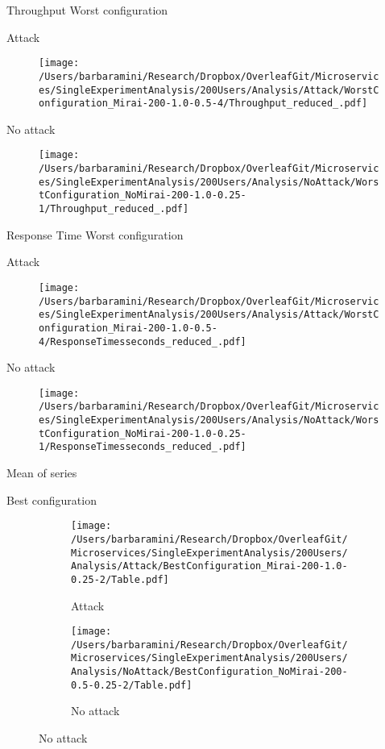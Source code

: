 \documentclass[10pt]{article}
\begin{document}
\break
Throughput Worst configuration \par
Attack 

\begin{figure}[h]
\texttt{[image: /Users/barbaramini/Research/Dropbox/OverleafGit/Microservices/SingleExperimentAnalysis/200Users/Analysis/Attack/WorstConfiguration\_Mirai-200-1.0-0.5-4/Throughput\_reduced\_.pdf]}
\end{figure}

No attack
\begin{figure}[h]
\texttt{[image: /Users/barbaramini/Research/Dropbox/OverleafGit/Microservices/SingleExperimentAnalysis/200Users/Analysis/NoAttack/WorstConfiguration\_NoMirai-200-1.0-0.25-1/Throughput\_reduced\_.pdf]}
\end{figure}

\break
Response Time Worst configuration \par
Attack 

\begin{figure}[h]
\texttt{[image: /Users/barbaramini/Research/Dropbox/OverleafGit/Microservices/SingleExperimentAnalysis/200Users/Analysis/Attack/WorstConfiguration\_Mirai-200-1.0-0.5-4/ResponseTimesseconds\_reduced\_.pdf]}
\end{figure}
No attack
\begin{figure}[h]
\texttt{[image: /Users/barbaramini/Research/Dropbox/OverleafGit/Microservices/SingleExperimentAnalysis/200Users/Analysis/NoAttack/WorstConfiguration\_NoMirai-200-1.0-0.25-1/ResponseTimesseconds\_reduced\_.pdf]}
\end{figure}

\break
Mean of series\par
Best configuration \par
\begin{figure}[h]
\begin{subfigure}{.5\textwidth}
\texttt{[image: /Users/barbaramini/Research/Dropbox/OverleafGit/Microservices/SingleExperimentAnalysis/200Users/Analysis/Attack/BestConfiguration\_Mirai-200-1.0-0.25-2/Table.pdf]}
\caption{Attack}
\end{subfigure}
\begin{subfigure}{.5\textwidth}
\texttt{[image: /Users/barbaramini/Research/Dropbox/OverleafGit/Microservices/SingleExperimentAnalysis/200Users/Analysis/NoAttack/BestConfiguration\_NoMirai-200-0.5-0.25-2/Table.pdf]}
\caption{No attack}
\end{subfigure}
\end{figure}
\end{document}
